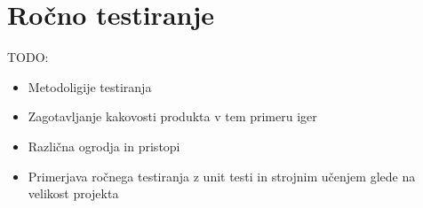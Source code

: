 
\chapter{Ročno testiranje}
TODO:
\begin{itemize}
    \item Metodoligije testiranja
    \item Zagotavljanje kakovosti produkta v tem primeru iger
    \item Različna ogrodja in pristopi~\cite{alja_kunovar}
    \item Primerjava ročnega testiranja z unit testi in strojnim učenjem glede na velikost projekta
\end{itemize}